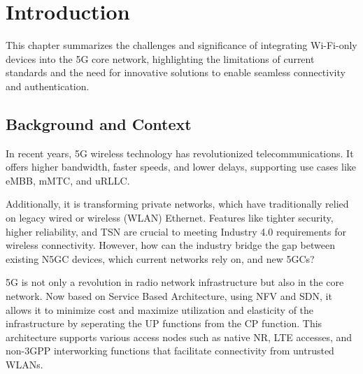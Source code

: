 \chapter{Introduction}%
\label{chapter:introduction}

\begin{introduction}
This chapter summarizes the challenges and significance of integrating Wi-Fi-only devices into the 5G core network, highlighting the limitations of current standards and the need for innovative solutions to enable seamless connectivity and authentication.
\end{introduction}

\section{Background and Context}


In recent years, \ac{5G} wireless technology has revolutionized telecommunications. It offers higher bandwidth, faster speeds, and lower delays, supporting use cases like \ac{eMBB}, \ac{mMTC}, and \ac{uRLLC}.

Additionally, it is transforming private networks, which have traditionally relied on legacy wired or wireless (WLAN) Ethernet. Features like tighter security, higher reliability, and \ac{TSN} are crucial to meeting Industry 4.0 requirements for wireless connectivity. However, how can the industry bridge the gap between existing \ac{N5GC} devices, which current networks rely on, and new \acp{5GC}?


\ac{5G} is not only a revolution in radio network infrastructure but also in the core network. Now based on Service Based Architecture, using \ac{NFV} and \ac{SDN}, it allows it to minimize cost and maximize utilization and elasticity of the infrastructure by seperating the \ac{UP} functions from the \ac{CP} function. This architecture supports various access nodes such as native \ac{NR}, LTE accesses, and non-\ac{3GPP} interworking functions that facilitate connectivity from untrusted WLANs.~\cite{23.501-p41}

